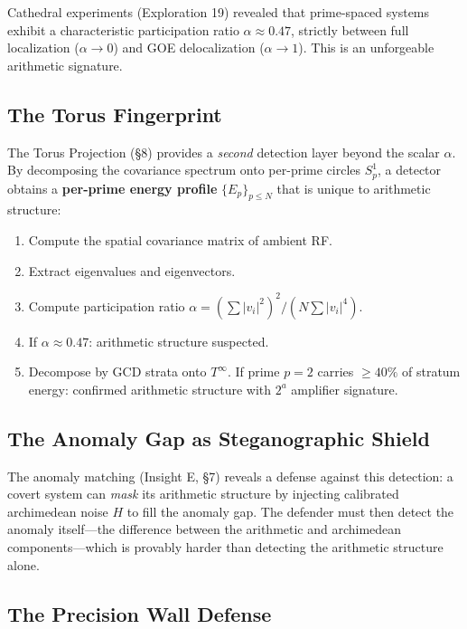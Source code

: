 \documentclass[11pt,a4paper]{article}
\begin{document}
Cathedral experiments (Exploration 19) revealed that prime-spaced
systems exhibit a characteristic participation ratio
$\alpha \approx 0.47$, strictly between full localization
($\alpha \to 0$) and GOE delocalization ($\alpha \to 1$). This
is an unforgeable arithmetic signature.

\subsection{The Torus Fingerprint}

The Torus Projection (\S8) provides a \emph{second} detection layer
beyond the scalar $\alpha$. By decomposing the covariance spectrum
onto per-prime circles $S^1_p$, a detector obtains a
\textbf{per-prime energy profile} $\{E_p\}_{p \leq N}$ that is
unique to arithmetic structure:

\begin{enumerate}
  \item Compute the spatial covariance matrix of ambient RF.
  \item Extract eigenvalues and eigenvectors.
  \item Compute participation ratio
    $\alpha = (\sum|v_i|^2)^2 / (N\sum|v_i|^4)$.
  \item If $\alpha \approx 0.47$: arithmetic structure suspected.
  \item Decompose by GCD strata onto $T^\infty$. If prime $p = 2$
    carries $\geq 40\%$ of stratum energy: confirmed arithmetic
    structure with $2^a$ amplifier signature.
\end{enumerate}

\subsection{The Anomaly Gap as Steganographic Shield}

The anomaly matching (Insight E, \S7) reveals a defense
against this detection: a covert system can \emph{mask} its
arithmetic structure by injecting calibrated archimedean noise
$H$ to fill the anomaly gap. The defender must then detect the
anomaly itself---the difference between the arithmetic and
archimedean components---which is provably harder than detecting
the arithmetic structure alone.

\subsection{The Precision Wall Defense}
\end{document}

